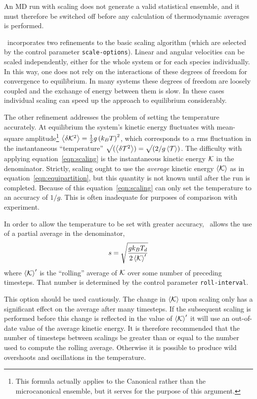 An MD run with scaling does not generate a valid statistical ensemble,
and it must therefore be switched off before any calculation of
thermodynamic averages is performed.

\moldy\ incorporates two refinements to the basic scaling algorithm
(which are selected by the control parameter \verb'scale-options').
Linear and angular velocities can be scaled independently, either for
the whole system or for each species individually.  In this way, one
does not rely on the interactions of these degrees of freedom for
convergence to equilibrium.  In many systems these degrees of freedom
are loosely coupled and the exchange of energy between them is slow.
In these cases individual scaling can speed up the approach to
equilibrium considerably.

The other refinement addresses the problem of setting the temperature
accurately.  At equilibrium the system's kinetic energy fluctuates
with mean-square amplitude\footnote{This formula actually applies to
the Canonical rather than the microcanonical ensemble, but it serves
for the purpose of this argument.} $\left < \delta {\cal K}^2\right > =
\frac{1}{2}g\left(k_BT\right)^2$, which corresponds to a
rms fluctuation in the instantaneous ``temperature'' 
$\sqrt{\mathstrut}( \left < \delta {\cal T}^2\right >) = 
\sqrt{\mathstrut} (2 /g\left < {\cal T}\right > )$.   The difficulty with applying equation~\ref{eqn:scaling}
is the instantaneous kinetic energy $\cal K$ in the denominator.
Strictly, scaling ought to use the {\em average\/} kinetic energy
$\left<\cal K \right>$ as in equation~\ref{eqn:equipartition}, but
this quantity is not known until after the run is completed.  Because
of this equation~\ref{eqn:scaling} can only set the temperature to an
accuracy of $1/g$.  This is often inadequate for purposes of
comparison with experiment.

In order to allow the temperature to be set with greater accuracy,
\moldy\ allows the use of a partial average in the denominator,
\begin{equation}
\label{eqn:rav-scaling}
s = \sqrt{\frac{gk_BT_d}{2\left < {\cal  K}\right >^\prime}}
\end{equation}
where $\left < {\cal K}\right >^\prime$ is the ``rolling'' average of
$\cal K$ over some number of preceding timesteps.  That number is
determined by the control parameter \verb'roll-interval'.   

This option should be used cautiously.  The change in $\left <{\cal
K}\right >$ upon scaling only has a significant effect on the average
after many timesteps. If the subsequent scaling is performed before
this change is reflected in the value of $\left < {\cal K}\right
>^\prime$ it will use an out-of-date value of the average kinetic
energy.  It is therefore recommended that the number of timesteps
between scalings be greater than or equal to the number used to
compute the rolling average.  Otherwise it is possible to produce wild
overshoots and oscillations in the temperature.

